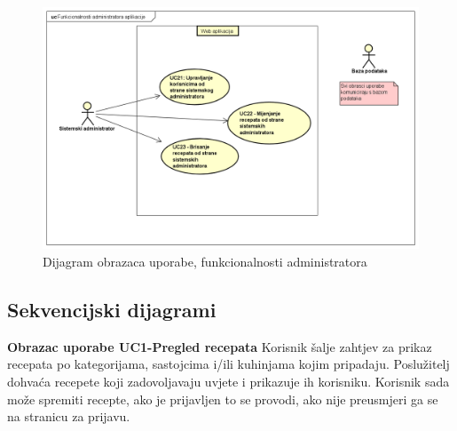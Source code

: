 					\begin{figure}[H]
						\includegraphics[scale= 0.42]{slike/UseCase Diagram4.png}
						\centering
						\caption{Dijagram obrazaca uporabe, funkcionalnosti administratora}
						\label{fig:Dijagram obrazaca uporabe, funkcionalnosti administratora}
					\end{figure}
					 
				\eject		
				
			\subsection{Sekvencijski dijagrami}
				
				\noindent
				\textbf{Obrazac uporabe UC1-Pregled recepata}\newline
					{Korisnik šalje zahtjev za prikaz recepata po kategorijama, sastojcima i/ili kuhinjama kojim pripadaju. Poslužitelj dohvaća recepete koji zadovoljavaju uvjete i prikazuje ih korisniku. Korisnik sada može spremiti recepte, ako je prijavljen to se provodi, ako nije preusmjeri ga se na stranicu za prijavu.}
				
